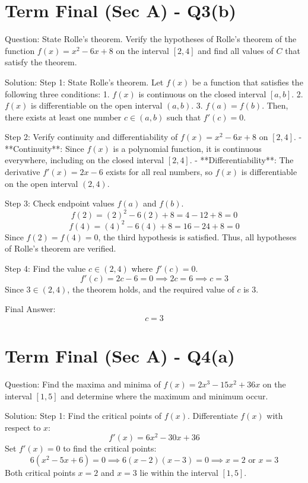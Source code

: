 \documentclass[11pt, a4paper]{article}
\begin{document}
\section*{Term Final (Sec A) - Q3(b)}
Question:
State Rolle's theorem. Verify the hypotheses of Rolle's theorem of the function $f(x) = x^2 - 6x + 8$ on the interval $[2,4]$ and find all values of $C$ that satisfy the theorem.

Solution:
Step 1: State Rolle's theorem.
Let $f(x)$ be a function that satisfies the following three conditions:
1. $f(x)$ is continuous on the closed interval $[a, b]$.
2. $f(x)$ is differentiable on the open interval $(a, b)$.
3. $f(a) = f(b)$.
Then, there exists at least one number $c \in (a, b)$ such that $f'(c) = 0$.

Step 2: Verify continuity and differentiability of $f(x) = x^2 - 6x + 8$ on $[2, 4]$.
- **Continuity**: Since $f(x)$ is a polynomial function, it is continuous everywhere, including on the closed interval $[2, 4]$.
- **Differentiability**: The derivative $f'(x) = 2x - 6$ exists for all real numbers, so $f(x)$ is differentiable on the open interval $(2, 4)$.

Step 3: Check endpoint values $f(a)$ and $f(b)$.
$$f(2) = (2)^2 - 6(2) + 8 = 4 - 12 + 8 = 0$$
$$f(4) = (4)^2 - 6(4) + 8 = 16 - 24 + 8 = 0$$
Since $f(2) = f(4) = 0$, the third hypothesis is satisfied. Thus, all hypotheses of Rolle's theorem are verified.

Step 4: Find the value $c \in (2, 4)$ where $f'(c) = 0$.
$$f'(c) = 2c - 6 = 0 \implies 2c = 6 \implies c = 3$$
Since $3 \in (2, 4)$, the theorem holds, and the required value of $c$ is $3$.

Final Answer:
$$
\boxed{c = 3}
$$


\section*{Term Final (Sec A) - Q4(a)}
Question:
Find the maxima and minima of $f(x) = 2x^3 - 15x^2 + 36x$ on the interval $[1,5]$ and determine where the maximum and minimum occur.

Solution:
Step 1: Find the critical points of $f(x)$.
Differentiate $f(x)$ with respect to $x$:
$$f'(x) = 6x^2 - 30x + 36$$
Set $f'(x) = 0$ to find the critical points:
$$6(x^2 - 5x + 6) = 0 \implies 6(x-2)(x-3) = 0 \implies x = 2 \text{ or } x = 3$$
Both critical points $x = 2$ and $x = 3$ lie within the interval $[1, 5]$.
\end{document}
